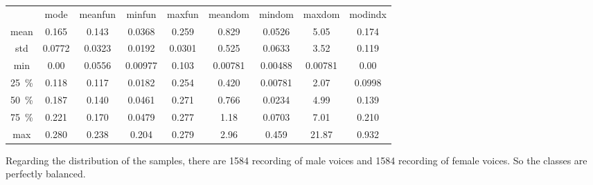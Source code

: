 \begin{table}[htb]
		\begin{subtable}{\textwidth}
			\centering
			\begin{tabular}{@{} c c c c  c c c c c @{}}\toprule
			 & mode & meanfun & minfun & maxfun & meandom & mindom & maxdom & modindx \\
			mean & \num{0.165} & \num{0.143} & \num{0.0368} & \num{0.259} & \num{0.829} & \num{0.0526} & \num{5.05} & \num{0.174} \\
			std & \num{0.0772} & \num{0.0323} & \num{0.0192} & \num{0.0301} & \num{0.525} & \num{0.0633} & \num{3.52} & \num{0.119} \\
			min & \num{0.00} & \num{0.0556} & \num{0.00977} & \num{0.103} & \num{0.00781} & \num{0.00488} & \num{0.00781} & \num{0.00} \\
			\SI{25}{\percent} & \num{0.118} & \num{0.117} & \num{0.0182} & \num{0.254} & \num{0.420} & \num{0.00781} & \num{2.07} & \num{0.0998} \\
			\SI{50}{\percent} & \num{0.187} & \num{0.140} & \num{0.0461} & \num{0.271} & \num{0.766} & \num{0.0234} & \num{4.99} & \num{0.139} \\
			\SI{75}{\percent} & \num{0.221} & \num{0.170} & \num{0.0479} & \num{0.277} & \num{1.18} & \num{0.0703} & \num{7.01} & \num{0.210} \\
			max & \num{0.280} & \num{0.238} & \num{0.204} & \num{0.279} & \num{2.96} & \num{0.459} & \num{21.87} & \num{0.932}\\ \bottomrule	
			\end{tabular}
		\end{subtable}\hfill\null%
	\label{tab_data_exploration}
\end{table}

Regarding the distribution of the samples, there are \num{1584} recording of male voices and \num{1584} recording of female voices. So the classes are perfectly balanced.

